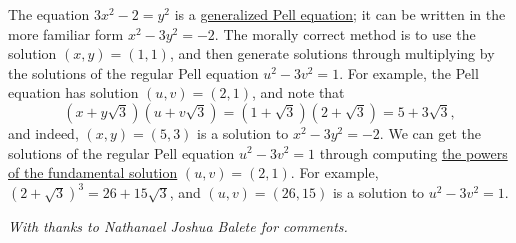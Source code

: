 \documentclass[11pt,paper=letter]{scrartcl}
\newenvironment{rem}%
{\noindent \ignorespaces \small \sffamily \sansmath {\bfseries Remark.}}%
{\ignorespacesafterend}
\begin{document}
\begin{enumerate}[align=left,leftmargin=*,resume]
\begin{rem}
The equation $3x^2 - 2 = y^2$ is a \href{https://en.wikipedia.org/wiki/Pell%27s_equation#Generalized_Pell's_equation}{generalized Pell equation}; it can be written in the more familiar form $x^2 - 3y^2 = -2$. The morally correct method is to use the solution $(x, y) = (1, 1)$, and then generate solutions through multiplying by the solutions of the regular Pell equation $u^2 - 3v^2 = 1$. For example, the Pell equation has solution $(u, v) = (2, 1)$, and note that \[
  \left(x + y\sqrt{3}\right)\left(u + v\sqrt{3}\right)
  = (1 + \sqrt{3})(2 + \sqrt{3})
  = 5 + 3\sqrt{3},
\]
and indeed, $(x, y) = (5, 3)$ is a solution to $x^2 - 3y^2 = -2$. We can get the solutions of the regular Pell equation $u^2 - 3v^2 = 1$ through computing \href{https://en.wikipedia.org/wiki/Pell%27s_equation#Additional_solutions_from_the_fundamental_solution}{the powers of the fundamental solution} $(u, v) = (2, 1)$. For example, $(2 + \sqrt{3})^3 = 26 + 15\sqrt{3}$, and $(u, v) = (26, 15)$ is a solution to $u^2 - 3v^2 = 1$. 
\end{rem}

\end{enumerate}

\emph{With thanks to Nathanael Joshua Balete for comments.}
\end{document}
